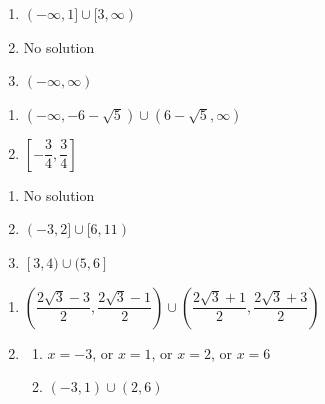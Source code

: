 \documentclass[11pt]{article}
\theoremstyle{definition}  %
\newcounter{HW}
\begin{document}
\begin{multicols}{3}
\begin{enumerate}
\setcounter{enumi}{\value{HW}}

 
\item $(-\infty,1] \cup [3,\infty)$
\item No solution  
\item $(-\infty, \infty)$

\setcounter{HW}{\value{enumi}}
\end{enumerate}
\end{multicols}

\begin{multicols}{2}
\begin{enumerate}
\setcounter{enumi}{\value{HW}}


\item $(-\infty, -6-\sqrt{5}) \cup (6-\sqrt{5}, \infty)$ 
\item $\left[ -\dfrac{3}{4}, \dfrac{3}{4}\right]$   


\setcounter{HW}{\value{enumi}}
\end{enumerate}
\end{multicols}

\begin{multicols}{3}
\begin{enumerate}
\setcounter{enumi}{\value{HW}}

\item No solution 
\item $(-3,2] \cup [6,11)$

\item $[3, 4) \cup (5, 6]$

\setcounter{HW}{\value{enumi}}
\end{enumerate}
\end{multicols}

\begin{enumerate}
\setcounter{enumi}{\value{HW}}

\item $\left(\dfrac{2 \sqrt{3} - 3}{2},  \dfrac{2 \sqrt{3} - 1}{2}   \right) \cup \left(\dfrac{2 \sqrt{3} +1}{2},  \dfrac{2 \sqrt{3} +3}{2}   \right)$

\item  \begin{enumerate} \item $x = -3$, or $x = 1$, or $x = 2$, or $x = 6$

\item $(-3,1) \cup (2,6)$

\end{enumerate}

\setcounter{HW}{\value{enumi}}
\end{enumerate}
\end{document}
